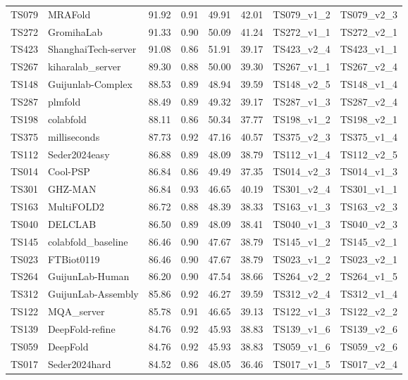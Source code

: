 \begin{table}[ht]
{\begin{tabular}{llllllll}
TS079 & MRAFold & 91.92 & 0.91 & 49.91 & 42.01 & TS079\_v1\_2 & TS079\_v2\_3 \\ 
TS272 & GromihaLab & 91.33 & 0.90 & 50.09 & 41.24 & TS272\_v1\_1 & TS272\_v2\_1 \\ 
TS423 & ShanghaiTech-server & 91.08 & 0.86 & 51.91 & 39.17 & TS423\_v2\_4 & TS423\_v1\_1 \\ 
TS267 & kiharalab\_server & 89.30 & 0.88 & 50.00 & 39.30 & TS267\_v1\_1 & TS267\_v2\_4 \\ 
TS148 & Guijunlab-Complex & 88.53 & 0.89 & 48.94 & 39.59 & TS148\_v2\_5 & TS148\_v1\_4 \\ 
TS287 & plmfold & 88.49 & 0.89 & 49.32 & 39.17 & TS287\_v1\_3 & TS287\_v2\_4 \\ 
TS198 & colabfold & 88.11 & 0.86 & 50.34 & 37.77 & TS198\_v1\_2 & TS198\_v2\_1 \\ 
TS375 & milliseconds & 87.73 & 0.92 & 47.16 & 40.57 & TS375\_v2\_3 & TS375\_v1\_4 \\ 
TS112 & Seder2024easy & 86.88 & 0.89 & 48.09 & 38.79 & TS112\_v1\_4 & TS112\_v2\_5 \\ 
TS014 & Cool-PSP & 86.84 & 0.86 & 49.49 & 37.35 & TS014\_v2\_3 & TS014\_v1\_3 \\ 
TS301 & GHZ-MAN & 86.84 & 0.93 & 46.65 & 40.19 & TS301\_v2\_4 & TS301\_v1\_1 \\ 
TS163 & MultiFOLD2 & 86.72 & 0.88 & 48.39 & 38.33 & TS163\_v1\_3 & TS163\_v2\_3 \\ 
TS040 & DELCLAB & 86.50 & 0.89 & 48.09 & 38.41 & TS040\_v1\_3 & TS040\_v2\_3 \\ 
TS145 & colabfold\_baseline & 86.46 & 0.90 & 47.67 & 38.79 & TS145\_v1\_2 & TS145\_v2\_1 \\ 
TS023 & FTBiot0119 & 86.46 & 0.90 & 47.67 & 38.79 & TS023\_v1\_2 & TS023\_v2\_1 \\ 
TS264 & GuijunLab-Human & 86.20 & 0.90 & 47.54 & 38.66 & TS264\_v2\_2 & TS264\_v1\_5 \\ 
TS312 & GuijunLab-Assembly & 85.86 & 0.92 & 46.27 & 39.59 & TS312\_v2\_4 & TS312\_v1\_4 \\ 
TS122 & MQA\_server & 85.78 & 0.91 & 46.65 & 39.13 & TS122\_v1\_3 & TS122\_v2\_2 \\ 
TS139 & DeepFold-refine & 84.76 & 0.92 & 45.93 & 38.83 & TS139\_v1\_6 & TS139\_v2\_6 \\ 
TS059 & DeepFold & 84.76 & 0.92 & 45.93 & 38.83 & TS059\_v1\_6 & TS059\_v2\_6 \\ 
TS017 & Seder2024hard & 84.52 & 0.86 & 48.05 & 36.46 & TS017\_v1\_5 & TS017\_v2\_4 \\ 

\end{tabular}}
\end{table}
